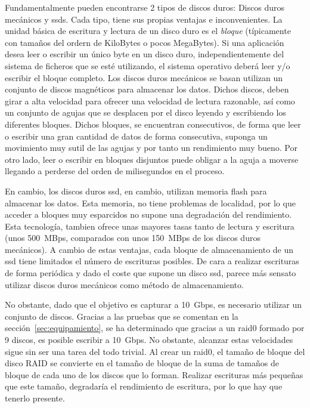 Fundamentalmente pueden encontrarse 2 tipos de discos duros: Discos duros mecánicos y \glspl{ssd}. Cada tipo, tiene sus propias ventajas e inconvenientes. La unidad básica de escritura y lectura de un disco duro es el \textit{bloque} (típicamente con tamaños del ordern de KiloBytes o pocos MegaBytes). Si una aplicación desea leer o escribir un único byte en un disco duro, independientemente del sistema de ficheros que se esté utilizando, el sistema operativo deberá leer y/o escribir el bloque completo.
Los discos duros mecánicos se basan utilizan un conjunto de discos magnéticos para almacenar los datos. Dichos discos, deben girar a alta velocidad para ofrecer una velocidad de lectura razonable, así como un conjunto de agujas que se desplacen por el disco leyendo y escribiendo los diferentes bloques. Dichos bloques, se encuentran consecutivos, de forma que leer o escribir una gran cantidad de datos de forma consecutiva, suponga un movimiento muy sutil de las agujas y por tanto un rendimiento muy bueno. Por otro lado, leer o escribir en bloques disjuntos puede obligar a la aguja a moverse llegando a perderse del orden de milisegundos en el proceso.

En cambio, los discos duros \gls{ssd}, en cambio, utilizan memoria flash para almacenar los datos. Esta memoria, no tiene problemas de localidad, por lo que acceder a bloques muy esparcidos no supone una degradación del rendimiento. Esta tecnología, tambien ofrece unas mayores tasas tanto de lectura y escritura (unos 500~MBps, comparados con unos 150~MBps de los discos duros mecánicos). A cambio de estas ventajas, cada bloque de almacenamiento de un \gls{ssd} tiene limitados el número de escrituras posibles. De cara a realizar escrituras de forma periódica y dado el coste que supone un disco \gls{ssd}, parece más sensato utilizar discos duros mecánicos como método de almacenamiento.

No obstante, dado que el objetivo es capturar a 10~Gbps, es necesario utilizar un conjunto de discos. Gracias a las pruebas que se comentan en la sección~\ref{sec:equipamiento}, se ha determinado que gracias a un \gls{raid0} formado por 9 discos, es posible escribir a 10~Gbps. No obstante, alcanzar estas velocidades sigue sin ser una tarea del todo trivial. Al crear un \gls{raid0}, el tamaño de bloque del disco RAID se convierte en el tamaño de bloque de la suma de tamaños de bloque de cada uno de los discos que lo forman. Realizar escrituras más pequeñas que este tamaño, degradaría el rendimiento de escritura, por lo que hay que tenerlo presente.

